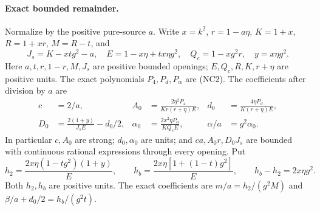 \paragraph{Exact bounded remainder.}
Normalize by the positive pure-source $a$. Write $x=k^2$,
$r=1-a\eta$, $K=1+x$, $R=1+xr$, $M=R-t$, and
\[
 J_s=K-xtg^2-a,\quad E=1-x\eta+tx\eta g^2,\quad
 Q_c=1-xg^2r,\quad y=x\eta g^2.
\]
Here $a,t,r,1-r,M,J_s$ are positive bounded openings; $E,Q_c,R,K,r+\eta$
are positive units. The exact polynomials $P_4,P_d,P_\alpha$ are (NC2).
The coefficients after division by $a$ are
\[
\begin{aligned}
 c&=2/a,& A_0&=\frac{2\eta^2P_4}{Kr(r+\eta)E},&
 d_0&=\frac{4\eta P_d}{K(r+\eta)E},\\
 D_0&=\frac{2(1+y)}{J_sE}-d_0/2,&
 \alpha_0&=\frac{2x^2\eta P_\alpha}{KQ_cE},&
 \alpha/a&=g^2\alpha_0.
\end{aligned}                                                     \tag{CU1}
\]
In particular $c,A_0$ are strong; $d_0,\alpha_0$ are units; and
$ca,A_0r,D_0J_s$ are bounded with continuous rational expressions
through every opening. Put
\[
 h_2=\frac{2x\eta(1-tg^2)(1+y)}E,\qquad
 h_b=\frac{2x\eta[1+(1-t)g^2]}E,
 \qquad h_b-h_2=2x\eta g^2.
\]
Both $h_2,h_b$ are positive units. The exact coefficients are
$m/a=h_2/(g^2M)$ and $\beta/a+d_0/2=h_b/(g^2t)$.


